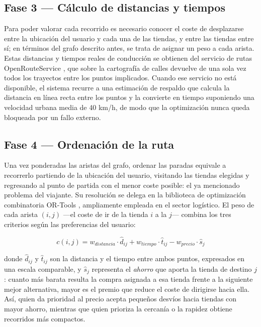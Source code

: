 \subsection{Fase 3 --- C\'alculo de distancias y tiempos}\label{subsec:distancias}

Para poder valorar cada recorrido es necesario conocer el coste de desplazarse entre la ubicaci\'on
del usuario y cada una de las tiendas, y entre las tiendas entre s\'i; en t\'erminos del grafo
descrito antes, se trata de asignar un peso a cada arista. Estas distancias y tiempos reales de
conducci\'on se obtienen del servicio de rutas OpenRouteService \cite{ors_docs}, que sobre la
cartograf\'ia de calles devuelve de una sola vez todos los trayectos entre los puntos implicados.
Cuando ese servicio no est\'a disponible, el sistema recurre a una estimaci\'on de respaldo que
calcula la distancia en l\'inea recta entre los puntos y la convierte en tiempo suponiendo una
velocidad urbana media de 40 km/h, de modo que la optimizaci\'on nunca queda bloqueada por un fallo
externo.

\subsection{Fase 4 --- Ordenaci\'on de la ruta}\label{subsec:ortools}

Una vez ponderadas las aristas del grafo, ordenar las paradas equivale a recorrerlo partiendo de la
ubicaci\'on del usuario, visitando las tiendas elegidas y regresando al punto de partida con el
menor coste posible: el ya mencionado problema del viajante. Su resoluci\'on se delega en la
biblioteca de optimizaci\'on combinatoria OR-Tools \cite{ortools_docs}, ampliamente empleada en el
sector log\'istico. El peso de cada arista $(i,j)$ ---el coste de ir de la tienda $i$ a la $j$---
combina los tres criterios seg\'un las preferencias del usuario:

\begin{equation}\label{eq:arc-cost}
  c(i,j) = w_{distancia} \cdot \hat{d}_{ij}
         + w_{tiempo} \cdot \hat{t}_{ij}
         - w_{precio} \cdot \hat{s}_{j}
\end{equation}

donde $\hat{d}_{ij}$ y $\hat{t}_{ij}$ son la distancia y el tiempo entre ambos puntos, expresados en
una escala comparable, y $\hat{s}_{j}$ representa el \emph{ahorro} que aporta la tienda de destino
$j$: cuanto m\'as barata resulta la compra asignada a esa tienda frente a la siguiente mejor
alternativa, mayor es el premio que reduce el coste de dirigirse hacia ella. As\'i, quien da
prioridad al precio acepta peque\~nos desv\'ios hacia tiendas con mayor ahorro, mientras que quien
prioriza la cercan\'ia o la rapidez obtiene recorridos m\'as compactos.

